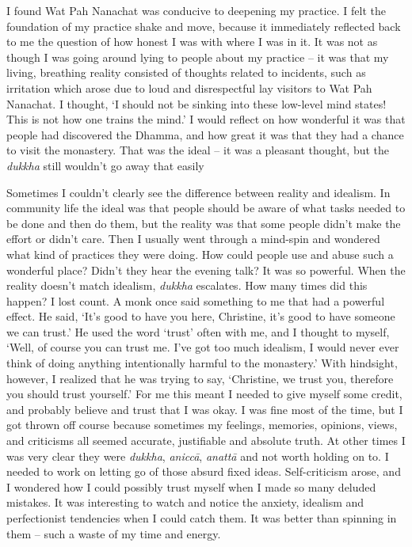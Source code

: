 I found Wat Pah Nanachat was conducive to deepening my practice. I felt
the foundation of my practice shake and move, because it immediately
reflected back to me the question of how honest I was with where I was
in it. It was not as though I was going around lying to people about my
practice -- it was that my living, breathing reality consisted of
thoughts related to incidents, such as irritation which arose due to
loud and disrespectful lay visitors to Wat Pah Nanachat. I thought, `I
should not be sinking into these low-level mind states! This is not how
one trains the mind.' I would reflect on how wonderful it was that
people had discovered the Dhamma, and how great it was that they had a
chance to visit the monastery. That was the ideal -- it was a pleasant
thought, but the \emph{dukkha} still wouldn't go away that easily

Sometimes I couldn't clearly see the difference between reality and
idealism. In community life the ideal was that people should be aware of
what tasks needed to be done and then do them, but the reality was that
some people didn't make the effort or didn't care. Then I usually went
through a mind-spin and wondered what kind of practices they were doing. 
How could people use and abuse such a wonderful place? Didn't they hear
the evening talk? It was so powerful. When the reality doesn't match
idealism, \emph{dukkha} escalates. How many times did this happen? I
lost count. A monk once said something to me that had a powerful effect. 
He said, `It's good to have you here, Christine, it's good to have
someone we can trust.' He used the word `trust' often with me, and I
thought to myself, `Well, of course you can trust me. I've got too much
idealism, I would never ever think of doing anything intentionally
harmful to the monastery.' With hindsight, however, I realized that he
was trying to say, `Christine, we trust you, therefore you should trust
yourself.' For me this meant I needed to give myself some credit, and
probably believe and trust that I was okay. I was fine most of the time, 
but I got thrown off course because sometimes my feelings, memories, 
opinions, views, and criticisms all seemed accurate, justifiable and
absolute truth. At other times I was very clear they were \emph{dukkha}, 
\emph{aniccā}, \emph{anattā} and not worth holding on to. I needed to
work on letting go of those absurd fixed ideas. Self-criticism arose, 
and I wondered how I could possibly trust myself when I made so many
deluded mistakes. It was interesting to watch and notice the anxiety, 
idealism and perfectionist tendencies when I could catch them. It was
better than spinning in them -- such a waste of my time and energy. 

